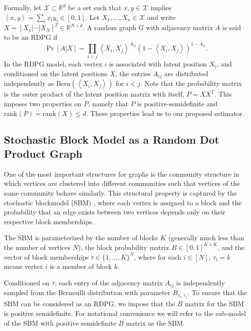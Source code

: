 \documentclass[10pt,letterpaper]{article}
\renewcommand{\Re}{\mathbb{R}}
\begin{document}
Formally, let $\mathcal{X} \subset \Re^d$ be a set such that $x, y \in \mathcal{X}$ implies $\left \langle  x,y \right \rangle =\sum_i x_i y_i \in [0, 1]$.
Let $X_1,\dotsc,X_n\in \mathcal{X}$ and write $X = [X_1|\cdots|X_N]^T \in \Re^{N \times d}$.
A random graph $G$ with adjacency matrix $A$ is said to be an RDPG if
\[
    \Pr[A|X] = \prod_{i<j} \left \langle X_i, X_j \right \rangle^{A_{ij}} \left( 1 - \left \langle X_i, X_j \right \rangle \right)^{1 - A_{ij}}.
\]
In the RDPG model, each vertex $i$ is associated with latent position $X_i$, and conditioned on the latent positions $X$, the entries $A_{ij}$ are distributed independently as $ \text{Bern}(\left \langle X_i, X_j \right \rangle)$ for $i<j$.
Note that the probability matrix is the outer product of the latent position matrix with itself, $P = X X^T$.
This imposes two properties on $P$, namely that $P$ is positive-semidefinite and $\mathrm{rank}(P)=\mathrm{rank}(X)\leq d$.
These properties lead us to our proposed estimator.



\subsection{Stochastic Block Model as a Random Dot Product Graph}
\label{section:sbm_rdpg}
One of the most important structures for graphs is the community structure in which vertices are clustered into different communities such that vertices of the same community behave similarly. This structural property is captured by the stochastic blockmodel (SBM) \cite{holland1983stochastic}, where each vertex is assigned to a block and the probability that an edge exists between two vertices depends only on their respective block memberships.

The SBM is parameterized by the number of blocks $K$ (generally much less than the number of vertices $N$), the block probability matrix $B \in [0,1]^{K \times K}$, and the vector of block memberships
$\tau\in\{1,\dotsc,K\}^N$, where for each $i \in [N]$, $\tau_i = k$ means vertex $i$ is a member of block $k$.

Conditioned on $\tau$, each entry of the adjacency matrix $A_{ij}$ is independently sampled from the Bernoulli distribution with parameter $B_{\tau_i,\tau_j}$.
To ensure that the SBM can be considered as an RDPG, we impose that the $B$ matrix for the SBM is positive semidefinite. 
For notational convenience we will refer to the sub-model of the SBM with positive semidefinite $B$ matrix as the SBM.
\end{document}
